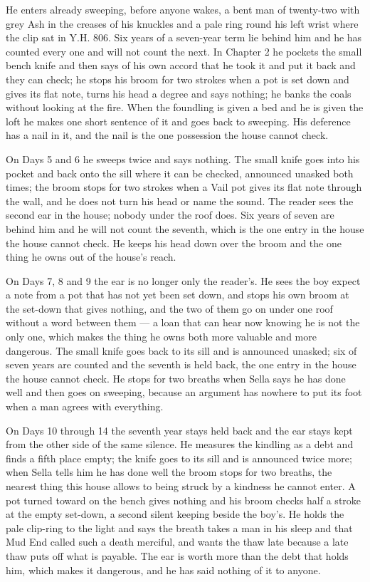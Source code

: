 \documentclass{design/chronicle}
\begin{document}
{
He enters already sweeping, before anyone wakes, a bent man of twenty-two with grey Ash in the creases of his knuckles and a pale ring round his left wrist where the clip sat in Y.H. 806. Six years of a seven-year term lie behind him and he has counted every one and will not count the next. In Chapter 2 he pockets the small bench knife and then says of his own accord that he took it and put it back and they can check; he stops his broom for two strokes when a pot is set down and gives its flat note, turns his head a degree and says nothing; he banks the coals without looking at the fire. When the foundling is given a bed and he is given the loft he makes one short sentence of it and goes back to sweeping. His deference has a nail in it, and the nail is the one possession the house cannot check.

On Days 5 and 6 he sweeps twice and says nothing. The small knife goes into his pocket and back onto the sill where it can be checked, announced unasked both times; the broom stops for two strokes when a Vail pot gives its flat note through the wall, and he does not turn his head or name the sound. The reader sees the second ear in the house; nobody under the roof does. Six years of seven are behind him and he will not count the seventh, which is the one entry in the house the house cannot check. He keeps his head down over the broom and the one thing he owns out of the house’s reach.

On Days 7, 8 and 9 the ear is no longer only the reader’s. He sees the boy expect a note from a pot that has not yet been set down, and stops his own broom at the set-down that gives nothing, and the two of them go on under one roof without a word between them --- a loan that can hear now knowing he is not the only one, which makes the thing he owns both more valuable and more dangerous. The small knife goes back to its sill and is announced unasked; six of seven years are counted and the seventh is held back, the one entry in the house the house cannot check. He stops for two breaths when Sella says he has done well and then goes on sweeping, because an argument has nowhere to put its foot when a man agrees with everything.

On Days 10 through 14 the seventh year stays held back and the ear stays kept from the other side of the same silence. He measures the kindling as a debt and finds a fifth place empty; the knife goes to its sill and is announced twice more; when Sella tells him he has done well the broom stops for two breaths, the nearest thing this house allows to being struck by a kindness he cannot enter. A pot turned toward on the bench gives nothing and his broom checks half a stroke at the empty set-down, a second silent keeping beside the boy’s. He holds the pale clip-ring to the light and says the breath takes a man in his sleep and that Mud End called such a death merciful, and wants the thaw late because a late thaw puts off what is payable. The ear is worth more than the debt that holds him, which makes it dangerous, and he has said nothing of it to anyone.

}
\end{document}
